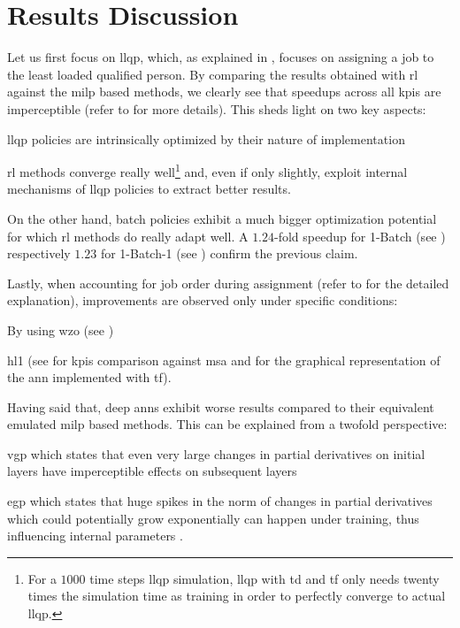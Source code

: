 \section{ Results Discussion}
\label{sec:rl_discussion}

Let us first focus on \gls{llqp}, which, as explained in , focuses on assigning a job to the least loaded qualified person. By comparing the results obtained with \gls{rl} against the \gls{milp} based methods, we clearly see that speedups across all \glspl{kpi} are imperceptible (refer to  for more details). This sheds light on two key aspects:
\begin{enumerate*}
	\item \gls{llqp} policies are intrinsically optimized by their nature of implementation
	\item \gls{rl} methods converge really well\footnote{For a $1000$ time steps \gls{llqp} simulation, \gls{llqp} with \gls{td} and \gls{tf} only needs twenty times the simulation time as training in order to perfectly converge to actual \gls{llqp}.} and, even if only slightly, exploit internal mechanisms of \gls{llqp} policies to extract better results.
\end{enumerate*}

On the other hand, batch policies exhibit a much bigger optimization potential for which \gls{rl} methods do really adapt well. A $1.24$-fold speedup for 1-Batch (see ) respectively $1.23$ for 1-Batch-1 (see ) confirm the previous claim.

Lastly, when accounting for job order during assignment (refer to  for the detailed explanation), improvements are observed only under specific conditions:
\begin{enumerate*}
	\item By using \gls{wzo} (see ) 
	\item \gls{hl1} (see  for \glspl{kpi} comparison against \gls{msa} and  for the graphical representation of the \gls{ann} implemented with \gls{tf}).
\end{enumerate*}

Having said that, deep \glspl{ann} exhibit worse results compared to their equivalent emulated \gls{milp} based methods. This can be explained from a twofold perspective:
\begin{enumerate*}
	\item \gls{vgp} which states that even very large changes in partial derivatives on initial layers have imperceptible effects on subsequent layers \citep{Bengio1994}
	\item \gls{egp} which states that huge spikes in the norm of changes in partial derivatives which could potentially grow exponentially can happen under training, thus influencing internal parameters \citep{Bengio1994,Pascanu2012}.
\end{enumerate*}

